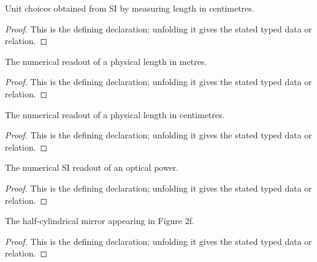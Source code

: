 \begin{definition}[centimeterUnits]
  \label{decl:physics:IPhO_2026_2_B_3:centimeterUnits}
  Unit choices obtained from SI by measuring length in centimetres.
\end{definition}
\begin{proof}
  This is the defining declaration; unfolding it gives the stated typed data or relation.
\end{proof}

\begin{definition}[lengthInMeters]
  \label{decl:physics:IPhO_2026_2_B_3:lengthInMeters}
  The numerical readout of a physical length in metres.
\end{definition}
\begin{proof}
  This is the defining declaration; unfolding it gives the stated typed data or relation.
\end{proof}

\begin{definition}[lengthInCentimeters]
  \label{decl:physics:IPhO_2026_2_B_3:lengthInCentimeters}
  The numerical readout of a physical length in centimetres.
\end{definition}
\begin{proof}
  This is the defining declaration; unfolding it gives the stated typed data or relation.
\end{proof}

\begin{definition}[powerInSI]
  \label{decl:physics:IPhO_2026_2_B_3:powerInSI}
  The numerical SI readout of an optical power.
\end{definition}
\begin{proof}
  This is the defining declaration; unfolding it gives the stated typed data or relation.
\end{proof}

\begin{definition}[HalfCylindricalMirror]
  \label{decl:physics:IPhO_2026_2_B_3:HalfCylindricalMirror}
  The half-cylindrical mirror appearing in Figure 2f.
\end{definition}
\begin{proof}
  This is the defining declaration; unfolding it gives the stated typed data or relation.
\end{proof}

